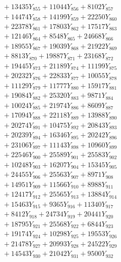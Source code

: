 \documentclass[a4paper,10pt]{article}
\begin{document}
{\begin{align}
&\;  + 13435 Y_{855} + 11044 Y_{856} + 8102 Y_{857} \\[0.3ex]
&\;  + 14474 Y_{858} + 14199 Y_{859} + 22250 Y_{860} \\[0.3ex]
&\;  + 22378 Y_{861} + 17803 Y_{862} + 17517 Y_{863} \\[0.3ex]
&\;  + 12146 Y_{864} + 8548 Y_{865} + 24668 Y_{866} \\[0.3ex]
&\;  + 18955 Y_{867} + 19039 Y_{868} + 21922 Y_{869} \\[0.5ex]\allowbreak
&\;  + 8813 Y_{870} + 19887 Y_{871} + 23168 Y_{872} \\[0.3ex]
&\;  + 19445 Y_{873} + 21189 Y_{874} + 11199 Y_{875} \\[0.3ex]
&\;  + 20232 Y_{876} + 22833 Y_{877} + 10055 Y_{878} \\[0.3ex]
&\;  + 11129 Y_{879} + 11777 Y_{880} + 15917 Y_{881} \\[0.3ex]
&\;  + 19084 Y_{882} + 25320 Y_{883} + 9871 Y_{884} \\[0.3ex]
&\;  + 10024 Y_{885} + 21974 Y_{886} + 8609 Y_{887} \\[0.3ex]
&\;  + 17094 Y_{888} + 22118 Y_{889} + 13988 Y_{890} \\[0.3ex]
&\;  + 20274 Y_{891} + 10475 Y_{892} + 20843 Y_{893} \\[0.3ex]
&\;  + 20239 Y_{894} + 16346 Y_{895} + 20242 Y_{896} \\[0.3ex]
&\;  + 23106 Y_{897} + 11143 Y_{898} + 10960 Y_{899} \\[0.5ex]\allowbreak
&\;  + 22546 Y_{900} + 25589 Y_{901} + 25583 Y_{902} \\[0.3ex]
&\;  + 10248 Y_{903} + 16207 Y_{904} + 15345 Y_{905} \\[0.3ex]
&\;  + 24455 Y_{906} + 25563 Y_{907} + 8971 Y_{908} \\[0.3ex]
&\;  + 14951 Y_{909} + 11566 Y_{910} + 8988 Y_{911} \\[0.3ex]
&\;  + 12417 Y_{912} + 25565 Y_{913} + 13884 Y_{914} \\[0.3ex]
&\;  + 15463 Y_{915} + 9365 Y_{916} + 11340 Y_{917} \\[0.3ex]
&\;  + 8412 Y_{918} + 24734 Y_{919} + 20441 Y_{920} \\[0.3ex]
&\;  + 18795 Y_{921} + 25568 Y_{922} + 6844 Y_{923} \\[0.3ex]
&\;  + 19174 Y_{924} + 10298 Y_{925} + 19553 Y_{926} \\[0.3ex]
&\;  + 21478 Y_{927} + 20993 Y_{928} + 24522 Y_{929} \\[0.5ex]\allowbreak
&\;  + 14543 Y_{930} + 21042 Y_{931} + 9500 Y_{932} \\[0.3ex]

\end{align}}
\end{document}
